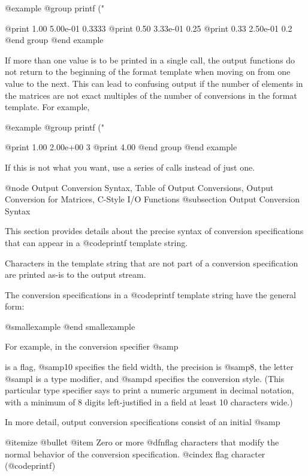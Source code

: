 {{{{{{{{{{{{@example
@group
printf ("%

     @print{} 1.00   5.00e-01   0.3333
     @print{} 0.50   3.33e-01     0.25
     @print{} 0.33   2.50e-01      0.2
@end group
@end example

If more than one value is to be printed in a single call, the output
functions do not return to the beginning of the format template when
moving on from one value to the next.  This can lead to confusing output
if the number of elements in the matrices are not exact multiples of the
number of conversions in the format template.  For example,

@example
@group
printf ("%

     @print{} 1.00   2.00e+00        3
     @print{} 4.00
@end group
@end example

If this is not what you want, use a series of calls instead of just one.

@node Output Conversion Syntax, Table of Output Conversions, Output Conversion for Matrices, C-Style I/O Functions
@subsection Output Conversion Syntax

This section provides details about the precise syntax of conversion
specifications that can appear in a @code{printf} template
string.

Characters in the template string that are not part of a
conversion specification are printed as-is to the output stream.

The conversion specifications in a @code{printf} template string have
the general form:

@smallexample
@end smallexample

For example, in the conversion specifier @samp{%
is a flag, @samp{10} specifies the field width, the precision is
@samp{8}, the letter @samp{l} is a type modifier, and @samp{d} specifies
the conversion style.  (This particular type specifier says to print a
numeric argument in decimal notation, with a minimum of 8 digits
left-justified in a field at least 10 characters wide.)

In more detail, output conversion specifications consist of an
initial @samp{%

@itemize @bullet
@item 
Zero or more @dfn{flag characters} that modify the normal behavior of
the conversion specification.
@cindex flag character (@code{printf})

}}}}}}}}}}}}}}
